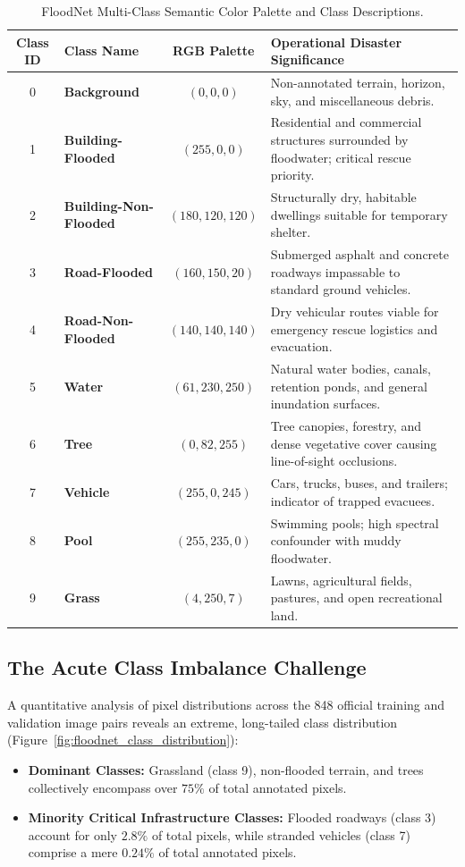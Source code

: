 \begin{table}[htbp]
\centering
\small
\caption{FloodNet Multi-Class Semantic Color Palette and Class Descriptions.}
\label{tab:floodnet_classes}
\begin{tabular}{c l c p{7.5cm}}
\toprule
\textbf{Class ID} & \textbf{Class Name} & \textbf{RGB Palette} & \textbf{Operational Disaster Significance} \\
\midrule
0 & \textbf{Background} & $(0, 0, 0)$ & Non-annotated terrain, horizon, sky, and miscellaneous debris. \\
1 & \textbf{Building-Flooded} & $(255, 0, 0)$ & Residential and commercial structures surrounded by floodwater; critical rescue priority. \\
2 & \textbf{Building-Non-Flooded} & $(180, 120, 120)$ & Structurally dry, habitable dwellings suitable for temporary shelter. \\
3 & \textbf{Road-Flooded} & $(160, 150, 20)$ & Submerged asphalt and concrete roadways impassable to standard ground vehicles. \\
4 & \textbf{Road-Non-Flooded} & $(140, 140, 140)$ & Dry vehicular routes viable for emergency rescue logistics and evacuation. \\
5 & \textbf{Water} & $(61, 230, 250)$ & Natural water bodies, canals, retention ponds, and general inundation surfaces. \\
6 & \textbf{Tree} & $(0, 82, 255)$ & Tree canopies, forestry, and dense vegetative cover causing line-of-sight occlusions. \\
7 & \textbf{Vehicle} & $(255, 0, 245)$ & Cars, trucks, buses, and trailers; indicator of trapped evacuees. \\
8 & \textbf{Pool} & $(255, 235, 0)$ & Swimming pools; high spectral confounder with muddy floodwater. \\
9 & \textbf{Grass} & $(4, 250, 7)$ & Lawns, agricultural fields, pastures, and open recreational land. \\
\bottomrule
\end{tabular}
\end{table}

\subsection{The Acute Class Imbalance Challenge}
A quantitative analysis of pixel distributions across the 848 official training and validation image pairs reveals an extreme, long-tailed class distribution (Figure~\ref{fig:floodnet_class_distribution}):
\begin{itemize}
    \item \textbf{Dominant Classes:} Grassland (class 9), non-flooded terrain, and trees collectively encompass over $75\%$ of total annotated pixels.
    \item \textbf{Minority Critical Infrastructure Classes:} Flooded roadways (class 3) account for only $2.8\%$ of total pixels, while stranded vehicles (class 7) comprise a mere $0.24\%$ of total annotated pixels.
\end{itemize}

